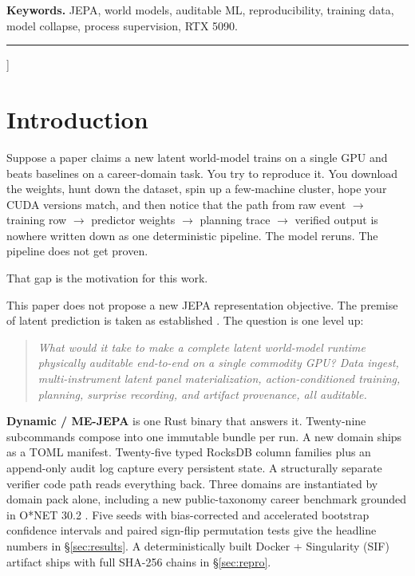 \documentclass[10pt,twocolumn,letterpaper]{article}
\begin{document}
\begin{onecolabstract}
  \vspace{4pt}
  \noindent\textbf{Keywords.} JEPA, world models, auditable ML,
  reproducibility, training data, model collapse, process
  supervision, RTX 5090.
  \end{onecolabstract}
  \vspace{6pt}
  \rule{\textwidth}{0.4pt}
  \vspace{8pt}
]

\section{Introduction}
\label{sec:intro}

Suppose a paper claims a new latent world-model trains on a single
GPU and beats baselines on a career-domain task. You try to
reproduce it. You download the weights, hunt down the dataset, spin
up a few-machine cluster, hope your CUDA versions match, and then
notice that the path from raw event $\to$ training row $\to$
predictor weights $\to$ planning trace $\to$ verified output is
nowhere written down as one deterministic pipeline. The model
reruns. The pipeline does not get proven.

That gap is the motivation for this work.

This paper does not propose a new JEPA representation objective.
The premise of latent prediction is taken as established
\citep{assran2023ijepa,bardes2024vjepa,lecun2022path}. The question
is one level up:
\begin{quote}
\itshape
What would it take to make a complete latent world-model runtime
physically auditable end-to-end on a single commodity GPU? Data
ingest, multi-instrument latent panel materialization,
action-conditioned training, planning, surprise recording, and
artifact provenance, all auditable.
\end{quote}

\textbf{Dynamic / ME-JEPA} is one Rust binary that answers it.
Twenty-nine subcommands compose into one immutable bundle per run.
A new domain ships as a TOML manifest. Twenty-five typed RocksDB
column families plus an append-only audit log capture every
persistent state. A structurally separate verifier code path reads
everything back. Three domains are instantiated by domain pack
alone, including a new public-taxonomy career benchmark grounded in
O*NET 30.2 \citep{onet2026}. Five seeds with bias-corrected and
accelerated bootstrap confidence intervals
\citep{efron2020automatic} and paired sign-flip permutation tests
give the headline numbers in \S\ref{sec:results}. A
deterministically built Docker + Singularity (SIF) artifact ships
with full SHA-256 chains in \S\ref{sec:repro}.
\end{document}
